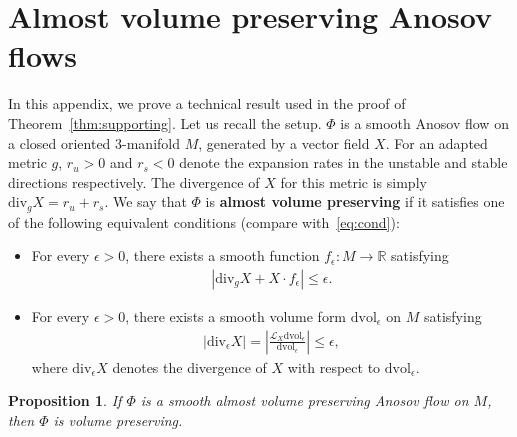 \documentclass[letterpaper, 11pt]{article}
\numberwithin{equation}{section}
\newtheorem{prop}[thm]{Proposition}
\newcommand{\R}{\mathbb{R}}
\begin{document}
	\section{Almost volume preserving Anosov flows} \label{appendixB}

In this appendix, we prove a technical result used in the proof of Theorem~\ref{thm:supporting}. Let us recall the setup. $\Phi$ is a smooth Anosov flow on a closed oriented $3$-manifold $M$, generated by a vector field $X$. For an adapted metric $g$, $r_u > 0$ and $r_s<0$ denote the expansion rates in the unstable and stable directions respectively. The divergence of $X$ for this metric is simply $\mathrm{div}_g X = r_u + r_s$. We say that $\Phi$ is \textbf{almost volume preserving} if it satisfies one of the following equivalent conditions (compare with~\eqref{eq:cond}):

\medskip

\begin{itemize}
\item[(C1)] For every $\epsilon >0$, there exists a smooth function $f_\epsilon : M \rightarrow \R$ satisfying \label{condC1}
\begin{align*}
\left\vert \mathrm{div}_g X + X \cdot f_\epsilon \right\vert \leq \epsilon.
\end{align*}
\item[(C2)] For every $\epsilon >0$, there exists a smooth volume form $\mathrm{dvol}_\epsilon$ on $M$ satisfying 
\begin{align*}
\vert \mathrm{div}_\epsilon X \vert = \left\vert \frac{\mathcal{L}_X \mathrm{dvol}_\epsilon}{\mathrm{dvol}_\epsilon } \right\vert \leq \epsilon,
\end{align*}
where $\mathrm{div}_\epsilon X$ denotes the divergence of $X$ with respect to $\mathrm{dvol}_\epsilon$.
\end{itemize}

\begin{prop} If $\Phi$ is a smooth almost volume preserving Anosov flow on $M$, then $\Phi$ is volume preserving.
\end{prop}
\end{document}
